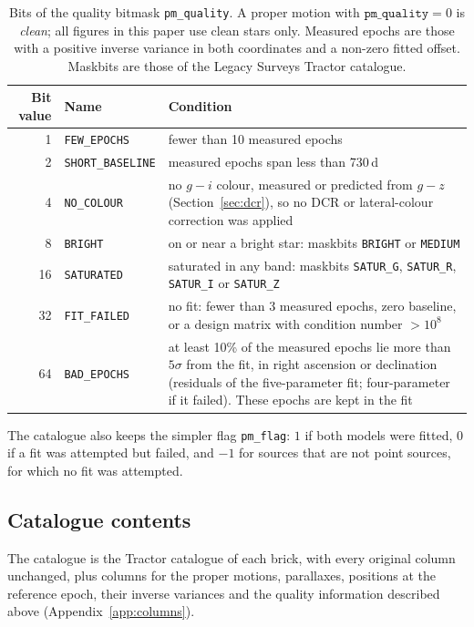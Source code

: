 \documentclass[usenatbib]{mnras}   %
\newcommand{\todo}[1]{{\color{red}{[TODO: #1]}}}
\begin{document}
\begin{table}
    \centering
    \caption{Bits of the quality bitmask \texttt{pm\_quality}. A proper motion with $\texttt{pm\_quality} = 0$ is \emph{clean}; all figures in this paper use clean stars only. Measured epochs are those with a positive inverse variance in both coordinates and a non-zero fitted offset. Maskbits are those of the Legacy Surveys Tractor catalogue.}
    \label{tab:pm_quality}
    \begin{tabular}{rlp{11.5cm}}
        \hline
        Bit value & Name & Condition \\
        \hline
        1  & \texttt{FEW\_EPOCHS}     & fewer than 10 measured epochs \\
        2  & \texttt{SHORT\_BASELINE} & measured epochs span less than 730\,d \\
        4  & \texttt{NO\_COLOUR}      & no $g-i$ colour, measured or predicted from $g-z$ (Section~\ref{sec:dcr}), so no DCR or lateral-colour correction was applied \\
        8  & \texttt{BRIGHT}          & on or near a bright star: maskbits \texttt{BRIGHT} or \texttt{MEDIUM} \\
        16 & \texttt{SATURATED}       & saturated in any band: maskbits \texttt{SATUR\_G}, \texttt{SATUR\_R}, \texttt{SATUR\_I} or \texttt{SATUR\_Z} \\
        32 & \texttt{FIT\_FAILED}     & no fit: fewer than 3 measured epochs, zero baseline, or a design matrix with condition number $> 10^8$ \\
        64 & \texttt{BAD\_EPOCHS}     & at least 10\% of the measured epochs lie more than $5\sigma$ from the fit, in right ascension or declination (residuals of the five-parameter fit; four-parameter if it failed). These epochs are kept in the fit \\
        \hline
    \end{tabular}
\end{table}

The catalogue also keeps the simpler flag \texttt{pm\_flag}: $1$ if both models were fitted, $0$ if a fit was attempted but failed, and $-1$ for sources that are not point sources, for which no fit was attempted.

\subsection{Catalogue contents} \label{sec:columns}

The catalogue is the Tractor catalogue of each brick, with every original column unchanged, plus columns for the proper motions, parallaxes, positions at the reference epoch, their inverse variances and the quality information described above (Appendix~\ref{app:columns}). \todo{Data release: where and in what form the catalogue is published.}
\end{document}

